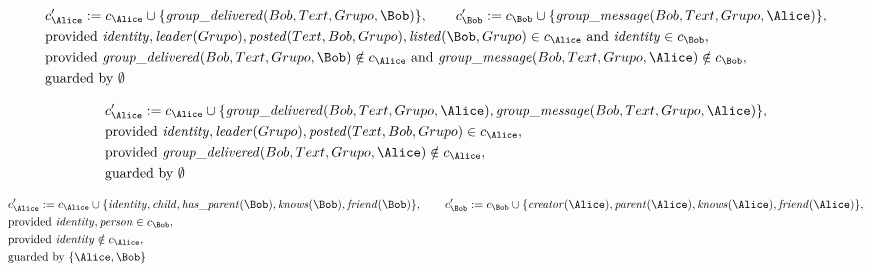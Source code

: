 \begin{align*}
&
c'_
{
\Alice
}
 := 
c_
{
\Alice
}
 \cup 
\{
\mathit{\detokenize{
group_delivered
}}
(
Bob
,
Text
,
Grupo
,
\Bob
)
\}
, \qquad 
c'_
{
\Bob
}
 := 
c_
{
\Bob
}
 \cup 
\{
\mathit{\detokenize{
group_message
}}
(
Bob
,
Text
,
Grupo
,
\Alice
)
\}
,\\
&
\text{provided } 
\mathit{\detokenize{
identity
}}
,
\mathit{\detokenize{
leader
}}
(
Grupo
)
,
\mathit{\detokenize{
posted
}}
(
Text
,
Bob
,
Grupo
)
,
\mathit{\detokenize{
listed
}}
(
\Bob
,
Grupo
)
 \in c_
{
\Alice
}
 \text{ and } 
\mathit{\detokenize{
identity
}}
 \in c_
{
\Bob
}
,\\
&
\text{provided } 
\mathit{\detokenize{
group_delivered
}}
(
Bob
,
Text
,
Grupo
,
\Bob
)
 \notin c_
{
\Alice
}
 \text{ and } 
\mathit{\detokenize{
group_message
}}
(
Bob
,
Text
,
Grupo
,
\Alice
)
 \notin c_
{
\Bob
}
,\\
&
\text{guarded by } \emptyset
\end{align*}

\begin{align*}
&
c'_
{
\Alice
}
 := 
c_
{
\Alice
}
 \cup 
\{
\mathit{\detokenize{
group_delivered
}}
(
Bob
,
Text
,
Grupo
,
\Alice
)
,
\mathit{\detokenize{
group_message
}}
(
Bob
,
Text
,
Grupo
,
\Alice
)
\}
,\\
&
\text{provided } 
\mathit{\detokenize{
identity
}}
,
\mathit{\detokenize{
leader
}}
(
Grupo
)
,
\mathit{\detokenize{
posted
}}
(
Text
,
Bob
,
Grupo
)
 \in c_
{
\Alice
}
,\\
&
\text{provided } 
\mathit{\detokenize{
group_delivered
}}
(
Bob
,
Text
,
Grupo
,
\Alice
)
 \notin c_
{
\Alice
}
,\\
&
\text{guarded by } \emptyset
\end{align*}

\begin{align*}
&
c'_
{
\Alice
}
 := 
c_
{
\Alice
}
 \cup 
\{
\mathit{\detokenize{
identity
}}
,
\mathit{\detokenize{
child
}}
,
\mathit{\detokenize{
has_parent
}}
(
\Bob
)
,
\mathit{\detokenize{
knows
}}
(
\Bob
)
,
\mathit{\detokenize{
friend
}}
(
\Bob
)
\}
, \qquad 
c'_
{
\Bob
}
 := 
c_
{
\Bob
}
 \cup 
\{
\mathit{\detokenize{
creator
}}
(
\Alice
)
,
\mathit{\detokenize{
parent
}}
(
\Alice
)
,
\mathit{\detokenize{
knows
}}
(
\Alice
)
,
\mathit{\detokenize{
friend
}}
(
\Alice
)
\}
,\\
&
\text{provided } 
\mathit{\detokenize{
identity
}}
,
\mathit{\detokenize{
person
}}
 \in c_
{
\Bob
}
,\\
&
\text{provided } 
\mathit{\detokenize{
identity
}}
 \notin c_
{
\Alice
}
,\\
&
\text{guarded by } \{
\Alice
,
\Bob
\}
\end{align*}
